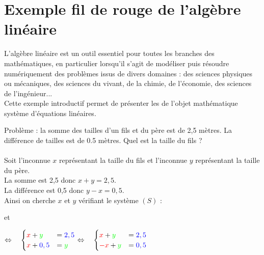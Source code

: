 \documentclass{book}
\begin{document}
\chapter*{Exemple fil de rouge de l'algèbre linéaire}

\begin{Texte}
L'algèbre linéaire est un outil essentiel pour toutes les branches des mathématiques, en particulier lorsqu'il s'agit
de modéliser puis résoudre numériquement des problèmes issus de divers domaines : des sciences physiques ou
mécaniques, des sciences du vivant, de la chimie, de l'économie, des sciences de l'ingénieur...\\
Cette exemple introductif permet de présenter les  de l'objet mathématique système d'équations linéaires.
\end{Texte}
\begin{Exemple}
Problème : la somme des tailles d'un fils et du père est de 2,5 mètres. La différence de tailles  est de 0.5 mètres.
Quel est la taille du fils ? \\
\\  
Soit l'inconnue $x$ représentant la taille du fils et l'inconnue $y$ représentant la taille du père.\\
La somme est 2,5 donc $x+y=2,5$.\\
La différence est 0,5 donc $y-x=0,5$.\\
Ainsi on cherche $x$ et $y$ vérifiant le système $(S)$  :
\begin{center}
et
$\Leftrightarrow\quad \begin{cases}
{\color{red}x}+{\color{green}y}&={\color{blue}2,5}\\
{\color{red}x}+{\color{blue}0,5}&={\color{green}y}
\end{cases}\Leftrightarrow\quad \begin{cases}
{\color{red}x}+{\color{green}y}&={\color{blue}2,5}\\
{\color{red}-x}+{\color{green}y}&={\color{blue}0,5}
\end{cases}
$		
\end{center}
\end{Exemple}
\end{document}
